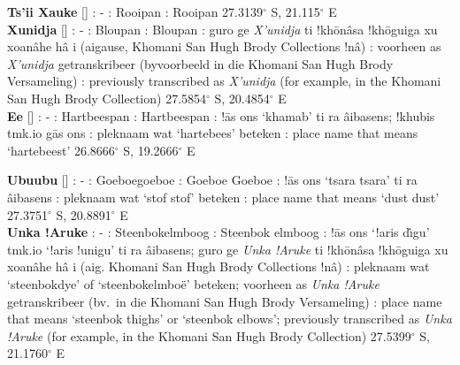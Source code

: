 \textbf{Ts'ii \textdoublevertline{}Xauke} [] : - :
Rooipan : Rooipan 27.3139$^{\circ}$ S, 21.115$^{\circ}$
E\\

\textbf{Xunidja} [] :
- : Bloupan : Bloupan :
\textdoublebarpipe{}guro ge \emph{X'unidja} ti
!kh\={o}\textdoublevertline{}n\^{a}sa
!kh\={o}\textdoublevertline{}guiga xu
xoa\textdoublevertline{}n\^{a}he h\^{a} i
(ai\textdoublevertline{}gause, \textdoublebarpipe{}Khomani San Hugh
Brody Collections !n\^{a}) : voorheen as
\emph{X'unidja} getranskribeer (byvoorbeeld in die
\textdoublebarpipe{}Khomani San Hugh Brody Versameling)
: previously transcribed as \emph{X'unidja} (for
example, in the \textdoublebarpipe{}Khomani San Hugh Brody
Collection) 27.5854$^{\circ}$ S, 20.4854$^{\circ}$ E \\

\textbf{\textvertline{}Ee} []
: - : Hartbeespan :
Hartbeespan : !\={a}s \textvertline{}ons
`\textdoublevertline{}khamab' ti ra \textdoublebarpipe{}\^{a}ibasens;
!khubis tmk.io \textdoublebarpipe{}g\={a}s \textvertline{}ons
: pleknaam wat `hartebees' beteken : place
name that means `hartebeest' 26.8666$^{\circ}$ S, 19.2666$^{\circ}$ E
\\

\newpage

\textbf{\textvertline{}Ubu\textvertline{}ubu}
[] : -
: Goeboegoeboe : Goeboe Goeboe
: !\={a}s \textvertline{}ons `tsara tsara' ti ra
\textdoublebarpipe{}\^{a}ibasens : pleknaam wat `stof
stof' beteken : place name that means `dust dust'
27.3751$^{\circ}$ S, 20.8891$^{\circ}$ E \\

\textbf{\textvertline{}Unka !Aruke} : - :
Steenbokelmboog : Steenbok elmboog :
!\={a}s \textvertline{}ons `!aris d\^{\i}gu' tmk.io `!aris !unigu' ti
ra \textdoublebarpipe{}\^{a}ibasens; \textdoublebarpipe{}guro ge
\emph{\textvertline{}Unka !Aruke} ti
!kh\={o}\textdoublevertline{}n\^{a}sa
!kh\={o}\textdoublevertline{}guiga xu xoa\textdoublevertline{}n\^{a}he
h\^{a} i (ai\textdoublevertline{}g. \textdoublebarpipe{}Khomani San
Hugh Brody Collections !n\^{a}) : pleknaam wat
`steenbokdye' of `steenbokelmbo\"{e}' beteken; voorheen as
\emph{\textvertline{}Unka !Aruke} getranskribeer (bv.\ in die
\textdoublebarpipe{}Khomani San Hugh Brody Versameling)
: place name that means `steenbok thighs' or `steenbok
elbows'; previously transcribed as \emph{\textvertline{}Unka !Aruke}
(for example, in the \textdoublebarpipe{}Khomani San Hugh Brody
Collection) 27.5399$^{\circ}$ S, 21.1760$^{\circ}$ E \\

